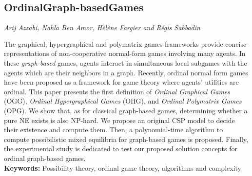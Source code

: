 \documentclass[../booklet.tex]{subfiles}
\begin{document}
\subsection[OrdinalGraph-basedGames. {\it Arij Azzabi, Nahla Ben Amor, Hélène Fargier and Régis Sabbadin}]{OrdinalGraph-basedGames}
   

\begin{center}
  {\it Arij Azzabi, Nahla Ben Amor, Hélène Fargier and Régis Sabbadin}
\end{center}

\vskip 0.8cm

 
 The graphical, hypergraphical and polymatrix games frameworks provide concise representations of non-cooperative normal-form games involving many agents. In these {\em graph-based} games, agents interact in simultaneous local subgames with the agents which are their neighbors in a graph. 
Recently, ordinal normal form games have been proposed as a framework for game theory where agents' utilities are ordinal. 
This paper presents the first definition of \emph{Ordinal Graphical Games} (OGG),  \emph{Ordinal Hypergraphical Games} (OHG), and \emph{Ordinal Polymatrix Games} (OPG). 
We show that, as for classical graph-based games, determining whether a pure NE exists is also NP-hard. We propose an original CSP model to decide their existence and compute them.
Then, a polynomial-time algorithm to compute possibilistic mixed equilibria for graph-based games is proposed. Finally, the experimental study is dedicated to test our proposed solution concepts for ordinal graph-based games.\\
{\bf Keywords:} Possibility theory, ordinal game theory, algorithms and complexity 
\end{document}

